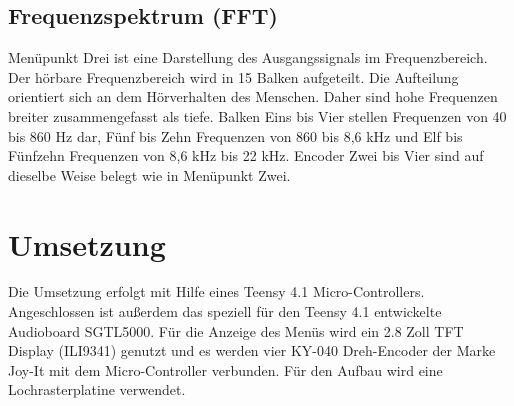 \documentclass[12pt]{article}
\begin{document}
\subsection{Frequenzspektrum (FFT)}
Menüpunkt Drei ist eine Darstellung des Ausgangssignals im Frequenzbereich. 
Der hörbare Frequenzbereich wird in 15 Balken aufgeteilt. Die Aufteilung orientiert sich an dem Hörverhalten des Menschen. 
Daher sind hohe Frequenzen breiter zusammengefasst als tiefe. 
Balken Eins bis Vier stellen Frequenzen von 40 bis 860 Hz dar, Fünf bis Zehn Frequenzen von 860 bis 8,6 kHz und Elf bis Fünfzehn Frequenzen von 8,6 kHz bis 22 kHz.
Encoder Zwei bis Vier sind auf dieselbe Weise belegt wie in Menüpunkt Zwei.
\newpage
\section{Umsetzung}
Die Umsetzung erfolgt mit Hilfe eines Teensy 4.1 Micro-Controllers. 
Angeschlossen ist außerdem das speziell für den Teensy 4.1 entwickelte Audioboard SGTL5000. 
Für die Anzeige des Menüs wird ein 2.8 Zoll TFT Display (ILI9341) genutzt und es werden vier KY-040 Dreh-Encoder der Marke Joy-It mit dem Micro-Controller verbunden. 
Für den Aufbau wird eine Lochrasterplatine verwendet.
\end{document}
